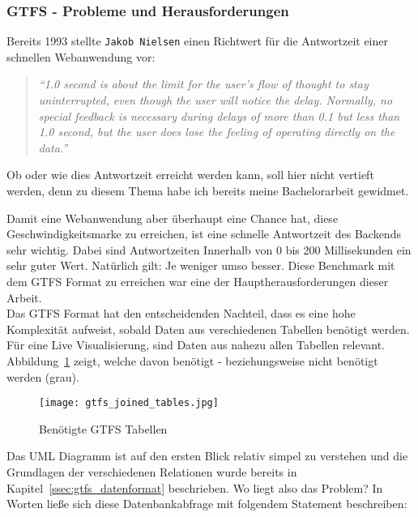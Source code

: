 \subsubsection{GTFS - Probleme und Herausforderungen}
\label{ssub:gtfs_probleme_und_herausforderungen}
   Bereits 1993 stellte \texttt{Jakob Nielsen} einen Richtwert für die Antwortzeit einer schnellen Webanwendung vor:

  \begin{quote}
    \textit{"`1.0 second is about the limit for the user's flow of thought to stay uninterrupted, even though the user will notice the delay. Normally, no special feedback is necessary during delays of more than 0.1 but less than 1.0 second, but the user does lose the feeling of operating directly on the data."'}\parencite{nielsen}
  \end{quote}

  Ob oder wie dies Antwortzeit erreicht werden kann, soll hier nicht vertieft werden, denn zu diesem Thema habe ich bereits meine Bachelorarbeit gewidmet\parencite{lorer}.

  Damit eine Webanwendung aber überhaupt eine Chance hat, diese Geschwindigkeitsmarke zu erreichen, ist eine schnelle Antwortzeit des Backends sehr wichtig. Dabei sind Antwortzeiten Innerhalb von 0 bis 200 Millisekunden ein sehr guter Wert. Natürlich gilt: Je weniger umso besser. Diese Benchmark mit dem GTFS Format zu erreichen war eine der Hauptherausforderungen dieser Arbeit.\\

  Das GTFS Format hat den entscheidenden Nachteil, dass es eine hohe Komplexität aufweist, sobald Daten aus verschiedenen Tabellen benötigt werden. Für eine Live Visualisierung, sind Daten aus nahezu allen Tabellen relevant. Abbildung~\ref{fig:gtfs_joined_tables} zeigt, welche davon benötigt - beziehungsweise nicht benötigt werden (grau).

  \begin{figure}[ht]
    \begin{center}
      \texttt{[image: gtfs\_joined\_tables.jpg]}
      \caption{Benötigte GTFS Tabellen\parencite{google_gtfs_reference}}
      \label{fig:gtfs_joined_tables}
    \end{center}
  \end{figure}

  Das UML Diagramm ist auf den ersten Blick relativ simpel zu verstehen und die Grundlagen der verschiedenen Relationen wurde bereits in Kapitel~\ref{ssec:gtfs_datenformat} beschrieben. Wo liegt also das Problem? In Worten ließe sich diese Datenbankabfrage mit folgendem Statement beschreiben: 

